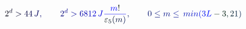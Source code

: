 \documentclass[12pt]{article}
\begin{document}
\makeatletter
\renewcommand*{\@textcolor}[3]{%
  \protect\leavevmode
  \begingroup
    \color#1{#2}#3%
  \endgroup
}
\makeatother
\begin{displaymath}
\mathcolor[RGB]{0,0,15}{2} ^ { \mathcolor[RGB]{0,0,30}{d} } \mathcolor[RGB]{0,0,45}{>} \mathcolor[RGB]{0,0,60}{4} \mathcolor[RGB]{0,0,75}{4} \, \mathcolor[RGB]{0,0,90}{J} \mathcolor[RGB]{0,0,105}{,} \qquad \mathcolor[RGB]{0,0,120}{2} ^ { \mathcolor[RGB]{0,0,135}{d} } \mathcolor[RGB]{0,0,150}{>} \mathcolor[RGB]{0,0,165}{6} \mathcolor[RGB]{0,0,180}{8} \mathcolor[RGB]{0,0,195}{1} \mathcolor[RGB]{0,0,210}{2} \, \mathcolor[RGB]{0,0,225}{J} \mathcolor[RGB]{0,0,240}{\frac { \mathcolor[RGB]{0,0,255}{m} \mathcolor[RGB]{0,15,0}{!} } { \mathcolor[RGB]{0,15,15}{\varepsilon} _ { \mathcolor[RGB]{0,15,30}{5} } \mathcolor[RGB]{0,15,45}{(} \mathcolor[RGB]{0,15,60}{m} \mathcolor[RGB]{0,15,75}{)} } } \mathcolor[RGB]{0,15,90}{,} \qquad \mathcolor[RGB]{0,15,105}{0} \mathcolor[RGB]{0,15,120}{\le} \mathcolor[RGB]{0,15,135}{m} \mathcolor[RGB]{0,15,150}{\le} \mathcolor[RGB]{0,15,165}{\operatorname*} { \mathcolor[RGB]{0,15,180}{m} \mathcolor[RGB]{0,15,195}{i} \mathcolor[RGB]{0,15,210}{n} } \mathcolor[RGB]{0,15,225}{(} \mathcolor[RGB]{0,15,240}{3} \mathcolor[RGB]{0,15,255}{L} \mathcolor[RGB]{0,30,0}{-} \mathcolor[RGB]{0,30,15}{3} \mathcolor[RGB]{0,30,30}{,} \mathcolor[RGB]{0,30,45}{2} \mathcolor[RGB]{0,30,60}{1} \mathcolor[RGB]{0,30,75}{)}
\end{displaymath}
\end{document}
